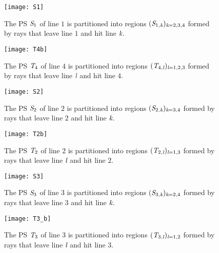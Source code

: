  \begin{figure}
 \begin{minipage}[]{.43\textwidth}
   \texttt{[image: S1]}
\caption{\footnotesize{The PS $\mbox{$\emph{S}_{\textit{$1$}}$}$ of line $1$ is partitioned into regions $(\mbox{$\emph{S}_{\textit{$1$,\textit{k}}}$})_{\textit{\textit{k}} = 2,3,4}$
   formed by rays that leave line $1$ and hit line $\textit{\textit{k}}$.}}
   \label{fig:S1}
 \end{minipage}
  \begin{minipage}[]{.45\textwidth}
  \centering
   \texttt{[image: T4b]}
   \caption{\footnotesize{The PS $\mbox{$\emph{T}_{\textit{$4$}}$}$ of line $4$ is partitioned into regions $(\mbox{$\emph{T}_{\textit{$4$,\textit{l}}}$})_{\textit{\textit{l}} = 1,2,3}$
   formed by rays that leave line $\textit{\textit{l}}$ and hit line $4$.}}
   \label{fig:T4b}
 \end{minipage}
\begin{minipage}[]{.43\textwidth}
\centering
   \texttt{[image: S2]}
\caption{\footnotesize{The PS $\mbox{$\emph{S}_{\textit{$2$}}$}$ of line $2$ is partitioned into regions $(\mbox{$\emph{S}_{\textit{$2$,\textit{k}}}$})_{\textit{\textit{k}} = 3,4}$
  formed by rays that leave line $2$ and hit line $\textit{\textit{k}}$.}} 
 \end{minipage}
 \begin{minipage}[]{.43\textwidth}
 \centering
   \texttt{[image: T2b]}
\caption{\footnotesize{The PS $\mbox{$\emph{T}_{\textit{$2$}}$}$ of line $2$ is partitioned into regions $(\mbox{$\emph{T}_{\textit{$2$,\textit{l}}}$})_{\textit{\textit{l}} = 1,3}$
formed by rays that leave line $\textit{\textit{l}}$ and hit line $2$. }} 
 \end{minipage}
 \begin{minipage}[]{.43\textwidth}
 \centering
   \texttt{[image: S3]}
   \caption{\footnotesize{The PS $\mbox{$\emph{S}_{\textit{$3$}}$}$ of line $3$ is partitioned into regions
   $(\mbox{$\emph{S}_{\textit{$3$,\textit{k}}}$})_{\textit{\textit{k}} = 2,4}$ formed by rays that leave line $3$ and hit line $\textit{\textit{k}}$. }} 
 \end{minipage}
 \hspace{1.7cm}
 \begin{minipage}[]{.43\textwidth}
 \centering
   \texttt{[image: T3\_b]}
  \caption{\footnotesize{The PS $\mbox{$\emph{T}_{\textit{$3$}}$}$ of line $3$ is partitioned into regions $(\mbox{$\emph{T}_{\textit{$3$,\textit{l}}}$})_{\textit{\textit{l}} = 1,2}$
   formed by rays that leave line $\textit{\textit{l}}$ and hit line $3$.}} 
\label{fig:T3}
 \end{minipage}
\end{figure}
